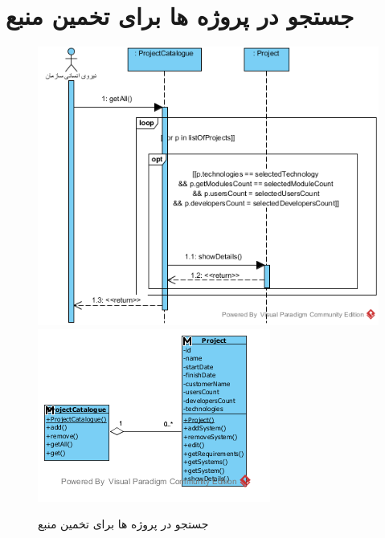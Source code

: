 \section{جستجو در پروژه ها برای تخمین منبع}
\begin{figure}[H]
	\centering
	\includegraphics[scale=0.8]{img/sequence-analysis/SearchInProjects}
	\includegraphics[scale=0.8]{img/sequence-analysis/SearchInProjectsC}
	\caption{جستجو در پروژه ها برای تخمین منبع}
\end{figure}

